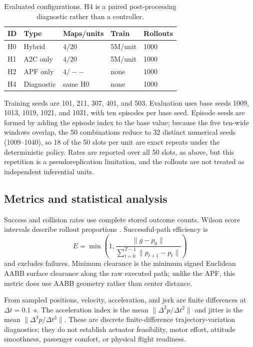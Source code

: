 \documentclass[conference]{IEEEtran}
\begin{document}
\begin{table}[t]
\centering
\caption{Evaluated configurations. H4 is a paired post-processing diagnostic rather than a controller.}
\label{tab:design}
\begin{tabular}{lllll}
\toprule
ID & Type & Maps/units & Train & Rollouts\\
\midrule
H0 & Hybrid & $4/20$ & 5M/unit & 1000\\
H1 & A2C only & $4/20$ & 5M/unit & 1000\\
H2 & APF only & $4/--$ & none & 1000\\
H4 & Diagnostic & same H0 & none & 1000\\
\bottomrule
\end{tabular}
\end{table}

Training seeds are 101, 211, 307, 401, and 503. Evaluation uses base seeds 1009, 1013, 1019, 1021, and 1031, with ten episodes per base seed. Episode seeds are formed by adding the episode index to the base value; because the five ten-wide windows overlap, the 50 combinations reduce to 32 distinct numerical seeds (1009--1040), so 18 of the 50 slots per unit are exact repeats under the deterministic policy. Rates are reported over all 50 slots, as above, but this repetition is a pseudoreplication limitation, and the rollouts are not treated as independent inferential units.

\subsection{Metrics and statistical analysis}
Success and collision rates use complete stored outcome counts. Wilson score intervals describe rollout proportions \cite{wilson1927probable}. Successful-path efficiency is
\begin{equation}
E=\min\left(1,\frac{\|g-p_0\|}{\sum_{t=0}^{T-1}\|p_{t+1}-p_t\|}\right)
\end{equation}
and excludes failures. Minimum clearance is the minimum signed Euclidean AABB surface clearance along the raw executed path; unlike the APF, this metric does use AABB geometry rather than center distance.

From sampled positions, velocity, acceleration, and jerk are finite differences at $\Delta t=0.1$~s. The acceleration index is the mean $\|\Delta^2p/\Delta t^2\|$ and jitter is the mean $\|\Delta^3p/\Delta t^3\|$. These are discrete finite-difference trajectory-variation diagnostics; they do not establish actuator feasibility, motor effort, attitude smoothness, passenger comfort, or physical flight readiness.
\end{document}

